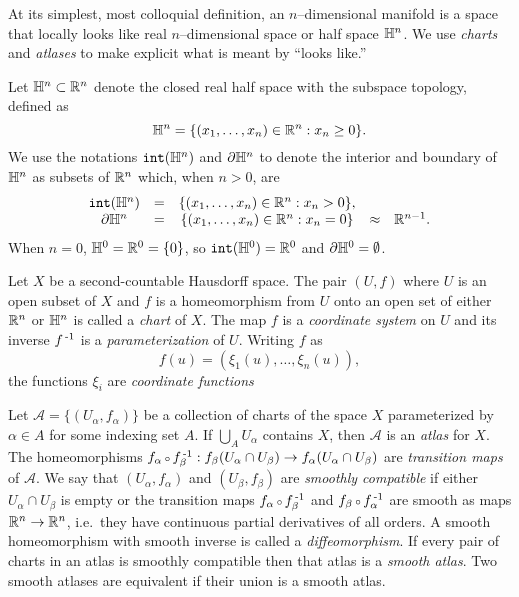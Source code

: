 At its simplest, most colloquial definition, an $n$--dimensional manifold is a space that locally looks like real $n$--dimensional space or half space $\mathbb{H}^n$.
We use \emph{charts} and \emph{atlases} to make explicit what is meant by ``looks like.''

\begin{defn}[Coordinates]
	\label{def:coordinates}
	Let $\mathbb{H}^n\subset\mathbb{R}^n$ denote the closed real half space with the subspace topology, defined as
	\[
		\mathbb{H}^n=\{(x_1,\dots,x_{n})\in\mathbb{R}^n : x_n\geq 0\}.
	\]
	We use the notations $\mathtt{int}(\mathbb{H}^n)$ and $\partial \mathbb{H}^n$ to denote the interior and boundary of $\mathbb{H}^n$ as subsets of $\mathbb{R}^n$ which, when $n>0$, are
	\[
		\begin{array}{ccccc}
			\mathtt{int}(\mathbb{H}^n) & = & \{(x_1,\dots,x_{n})\in\mathbb{R}^n : x_n > 0\}, & &\\
			\partial \mathbb{H}^n	& = & \{(x_1,\dots,x_{n})\in\mathbb{R}^n : x_n = 0\} & \approx & \mathbb{R}^{n-1}.
		\end{array}
	\]
	When $n=0$, $\mathbb{H}^0 = \mathbb{R}^0 = \{0\}$, so $\mathtt{int}(\mathbb{H}^0)=\mathbb{R}^0$ and $\partial\mathbb{H}^0=\emptyset$.

	Let $X$ be a second-countable Hausdorff space.
	The pair $(U,f)$ where $U$ is an open subset of $X$ and $f$ is a homeomorphism from $U$ onto an open set of either $\mathbb{R}^n$ or $\mathbb{H}^n$ is called a \emph{chart} of $X$.
	The map $f$ is a \emph{coordinate system} on $U$ and its inverse $f^{\,\text{-}1}$ is a \emph{parameterization} of $U$.
	Writing $f$ as
	\[
		f(u) = (\xi_1(u),\dots,\xi_n(u)),
	\]
	the functions $\xi_i$ are \emph{coordinate functions}
\end{defn}

\begin{defn}[Atlas]
	\label{def:atlas}
	Let $\mathcal{A}=\{(U_\alpha,f_\alpha)\}$ be a collection of charts of the space $X$ parameterized by $\alpha\in A$ for some indexing set $A$.
	If $\bigcup_A U_\alpha$ contains $X$, then $\mathcal{A}$ is an \emph{atlas} for $X$.
	The homeomorphisms $f_\alpha\comp f_\beta\inv:f_\beta(U_\alpha\cap U_\beta)\to f_\alpha(U_\alpha\cap U_\beta)$ are \emph{transition maps} of $\mathcal{A}$.
	We say that $(U_\alpha,f_\alpha)$ and $(U_\beta,f_\beta)$ are \emph{smoothly compatible} if either $U_\alpha\cap U_\beta$ is empty or the transition maps $f_\alpha\comp f_\beta\inv$ and $f_\beta\comp f_\alpha\inv$ are smooth as maps $\mathbb{R}^n\to\mathbb{R}^n$, i.e.\ they have continuous partial derivatives of all orders.
	A smooth homeomorphism with smooth inverse is called a \emph{diffeomorphism}.
	If every pair of charts in an atlas is smoothly compatible then that atlas is a \emph{smooth atlas}.
	Two smooth atlases are equivalent if their union is a smooth atlas.
\end{defn}

